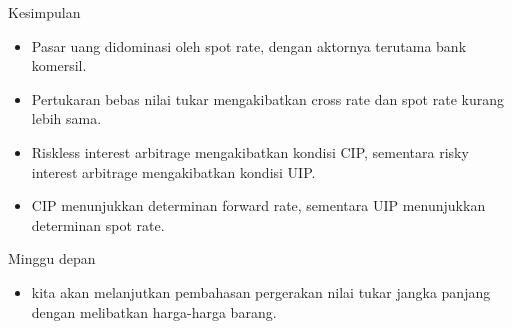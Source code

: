 \documentclass[
  ignorenonframetext,
]{beamer}
\providecommand{\tightlist}{%
  \setlength{\itemsep}{0pt}\setlength{\parskip}{0pt}}\usepackage{longtable,booktabs,array}
\begin{document}
\begin{frame}{Kesimpulan}
\label{kesimpulan-1}
\begin{itemize}
\item
  Pasar uang didominasi oleh spot rate, dengan aktornya terutama bank
  komersil.
\item
  Pertukaran bebas nilai tukar mengakibatkan cross rate dan spot rate
  kurang lebih sama.
\item
  Riskless interest arbitrage mengakibatkan kondisi CIP, sementara risky
  interest arbitrage mengakibatkan kondisi UIP.
\item
  CIP menunjukkan determinan forward rate, sementara UIP menunjukkan
  determinan spot rate.
\end{itemize}
\end{frame}

\begin{frame}{Minggu depan}
\label{minggu-depan}
\begin{itemize}
\tightlist
\item
  kita akan melanjutkan pembahasan pergerakan nilai tukar jangka panjang
  dengan melibatkan harga-harga barang.
\end{itemize}
\end{frame}
\end{document}
